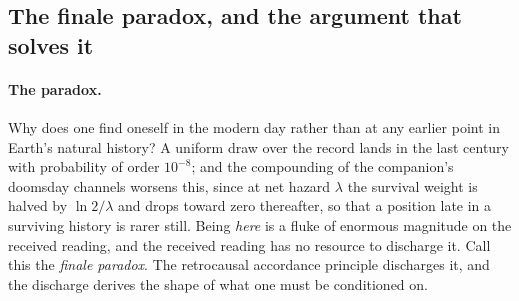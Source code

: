 \documentclass[11pt]{article}
\numberwithin{equation}{section}
\theoremstyle{plain}
\theoremstyle{definition}
\theoremstyle{remark}
\begin{document}
\subsection{The finale paradox, and the argument that solves it}
\label{ra:sub:finale}

\paragraph{The paradox.} Why does one find oneself in the modern day
rather than at any earlier point in Earth's natural history? A uniform
draw over the record lands in the last century with probability of order
$10^{-8}$; and the compounding of the companion's doomsday channels
worsens this, since at net hazard $\lambda$ the survival weight is
halved by $\ln2/\lambda$ and drops toward zero thereafter, so that a
position late in a surviving history is rarer still. Being \emph{here}
is a fluke of enormous magnitude on the received reading, and the
received reading has no resource to discharge it. Call this the
\emph{finale paradox}. The retrocausal accordance principle discharges
it, and the discharge derives the shape of what one must be conditioned
on.
\end{document}
